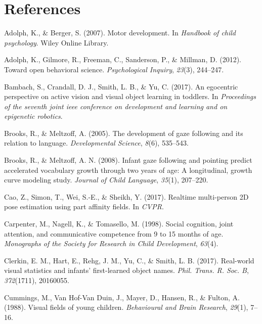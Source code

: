 \documentclass[10pt, letterpaper]{article}
\begin{document}
\section{References}\label{references}

\setlength{\parindent}{-0.1in} \setlength{\leftskip}{0.125in} \noindent

\hypertarget{refs}{}
\hypertarget{ref-adolph2007}{}
Adolph, K., \& Berger, S. (2007). Motor development. In \emph{Handbook
of child psychology}. Wiley Online Library.

\hypertarget{ref-adolph2012}{}
Adolph, K., Gilmore, R., Freeman, C., Sanderson, P., \& Millman, D.
(2012). Toward open behavioral science. \emph{Psychological Inquiry},
\emph{23}(3), 244--247.

\hypertarget{ref-bambach2017}{}
Bambach, S., Crandall, D. J., Smith, L. B., \& Yu, C. (2017). An
egocentric perspective on active vision and visual object learning in
toddlers. In \emph{Proceedings of the seventh joint ieee conference on
development and learning and on epigenetic robotics}.

\hypertarget{ref-brooks2005}{}
Brooks, R., \& Meltzoff, A. (2005). The development of gaze following
and its relation to language. \emph{Developmental Science}, \emph{8}(6),
535--543.

\hypertarget{ref-brooks2008}{}
Brooks, R., \& Meltzoff, A. N. (2008). Infant gaze following and
pointing predict accelerated vocabulary growth through two years of age:
A longitudinal, growth curve modeling study. \emph{Journal of Child
Language}, \emph{35}(1), 207--220.

\hypertarget{ref-cao2017realtime}{}
Cao, Z., Simon, T., Wei, S.-E., \& Sheikh, Y. (2017). Realtime
multi-person 2D pose estimation using part affinity fields. In
\emph{CVPR}.

\hypertarget{ref-carpenter1998}{}
Carpenter, M., Nagell, K., \& Tomasello, M. (1998). Social cognition,
joint attention, and communicative competence from 9 to 15 months of
age. \emph{Monographs of the Society for Research in Child Development},
\emph{63}(4).

\hypertarget{ref-clerkin2017}{}
Clerkin, E. M., Hart, E., Rehg, J. M., Yu, C., \& Smith, L. B. (2017).
Real-world visual statistics and infants' first-learned object names.
\emph{Phil. Trans. R. Soc. B}, \emph{372}(1711), 20160055.

\hypertarget{ref-cummings1988}{}
Cummings, M., Van Hof-Van Duin, J., Mayer, D., Hansen, R., \& Fulton, A.
(1988). Visual fields of young children. \emph{Behavioural and Brain
Research}, \emph{29}(1), 7--16.
\end{document}
